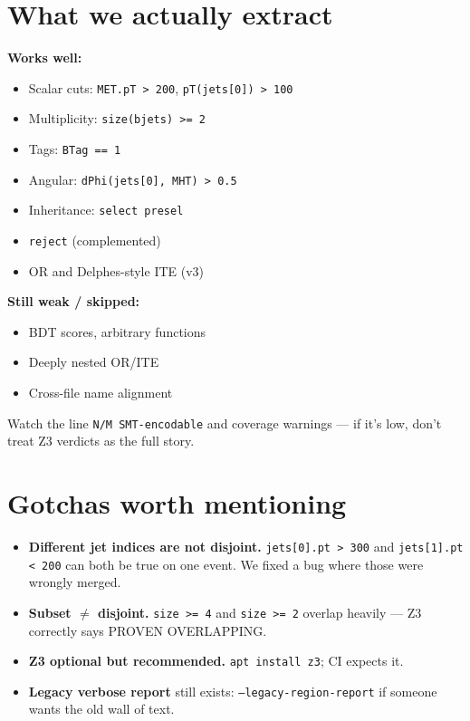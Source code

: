 \documentclass[11pt,a4paper]{article}
\begin{document}
\section{What we actually extract}

\textbf{Works well:}
\begin{itemize}
  \item Scalar cuts: \texttt{MET.pT > 200}, \texttt{pT(jets[0]) > 100}
  \item Multiplicity: \texttt{size(bjets) >= 2}
  \item Tags: \texttt{BTag == 1}
  \item Angular: \texttt{dPhi(jets[0], MHT) > 0.5}
  \item Inheritance: \texttt{select presel}
  \item \texttt{reject} (complemented)
  \item OR and Delphes-style ITE (v3)
\end{itemize}

\textbf{Still weak / skipped:}
\begin{itemize}
  \item BDT scores, arbitrary functions
  \item Deeply nested OR/ITE
  \item Cross-file name alignment
\end{itemize}

Watch the line \texttt{N/M SMT-encodable} and coverage warnings --- if it's low, don't
treat Z3 verdicts as the full story.

\section{Gotchas worth mentioning}

\begin{itemize}
  \item \textbf{Different jet indices are not disjoint.} \texttt{jets[0].pt > 300} and
        \texttt{jets[1].pt < 200} can both be true on one event. We fixed a bug where
        those were wrongly merged.
  \item \textbf{Subset $\neq$ disjoint.} \texttt{size >= 4} and \texttt{size >= 2} overlap
        heavily --- Z3 correctly says PROVEN OVERLAPPING.
  \item \textbf{Z3 optional but recommended.} \texttt{apt install z3}; CI expects it.
  \item \textbf{Legacy verbose report} still exists: \texttt{--legacy-region-report} if someone
        wants the old wall of text.
\end{itemize}
\end{document}
